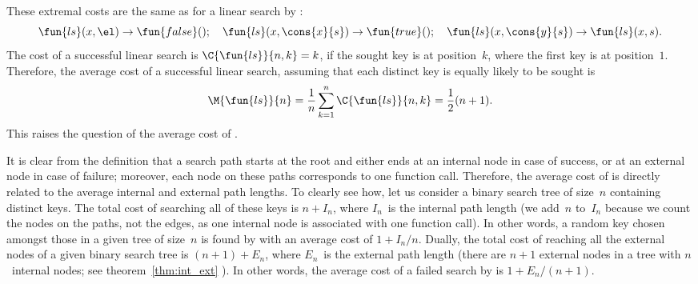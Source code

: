 These extremal costs are the same as for a linear search by :
\begin{equation*}
\fun{ls}(x,\el)          \rightarrow  \fun{false}();\quad
\fun{ls}(x,\cons{x}{s})  \rightarrow  \fun{true}();\quad
\fun{ls}(x,\cons{y}{s})  \rightarrow  \fun{ls}(x,s).
\end{equation*}
The cost of a successful linear search is \(\C{\fun{ls}}{n,k} = k\),
if the sought key is at position~\(k\), where the first key is at
position~\(1\). Therefore, the average cost of a successful linear
search, assuming that each distinct key is equally likely to be sought
is
\begin{equation*}
  \M{\fun{ls}}{n} = \frac{1}{n}\sum_{k=1}^{n}\C{\fun{ls}}{n,k} =
  \frac{1}{2}(n+1).
  \index{linear search}
  \index{ls@$\M{\fun{ls}}{n}$}
\end{equation*}
This raises the question of the average cost of
.


It is clear from the definition that a search path starts at the root
and either ends at an internal node in case of success, or at an
external node in case of failure; moreover, each node on these paths
corresponds to one function call. Therefore, the average cost of
 is directly related to the average
internal and
external path
lengths. To clearly see how, let us consider a binary search tree of
size~\(n\) containing distinct keys. The total cost of searching all
of these keys is \(n+I_n\), where \(I_n\)~is the internal path length
(we add~\(n\) to~\(I_n\) because we count the nodes on the paths, not
the edges, as one internal node is associated with one function
call). In other words, a random key chosen amongst those in a given
tree of size~\(n\) is found by  with an average cost of
\(1+I_n/n\). Dually, the total cost of reaching all the external nodes
of a given binary search tree is \((n+1)+E_n\), where \(E_n\)~is the
external path length (there are \(n+1\) external nodes in a tree
with \(n\)~internal nodes; see theorem~\ref{thm:int_ext}
). In other words, the average cost of a failed
search by  is \(1 + E_n/(n+1)\).

